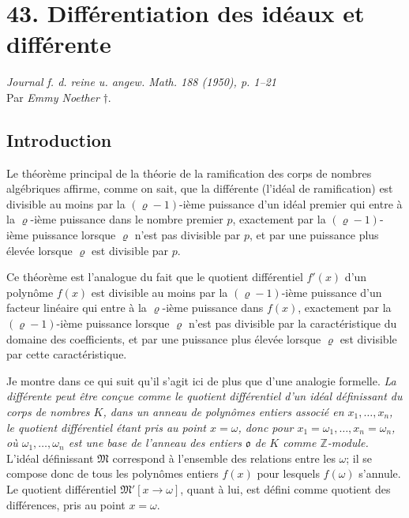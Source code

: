 \section*{43. Différentiation des idéaux et différente}

\begin{center}
\emph{Journal f. d. reine u. angew. Math. 188 (1950), p. 1--21}\\[0.75ex]
Par \emph{Emmy Noether} \(\dagger\).
\end{center}


\subsection*{Introduction}

Le théorème principal de la théorie de la ramification des corps de nombres algébriques affirme, comme on sait, que la différente (l'idéal de ramification) est divisible au moins par la \((\varrho-1)\)-ième puissance d'un idéal premier qui entre à la \(\varrho\)-ième puissance dans le nombre premier \(p\), exactement par la \((\varrho-1)\)-ième puissance lorsque \(\varrho\) n'est pas divisible par \(p\), et par une puissance plus élevée lorsque \(\varrho\) est divisible par \(p\).

Ce théorème est l'analogue du fait que le quotient différentiel \(f'(x)\) d'un polynôme \(f(x)\) est divisible au moins par la \((\varrho-1)\)-ième puissance d'un facteur linéaire qui entre à la \(\varrho\)-ième puissance dans \(f(x)\), exactement par la \((\varrho-1)\)-ième puissance lorsque \(\varrho\) n'est pas divisible par la caractéristique du domaine des coefficients, et par une puissance plus élevée lorsque \(\varrho\) est divisible par cette caractéristique.

Je montre dans ce qui suit qu'il s'agit ici de plus que d'une analogie formelle. \emph{La différente peut être conçue comme le quotient différentiel d'un idéal définissant du corps de nombres \(K\), dans un anneau de polynômes entiers associé en \(x_1,\ldots,x_n\), le quotient différentiel étant pris au point \(x=\omega\), donc pour \(x_1=\omega_1,\ldots,x_n=\omega_n\), où \(\omega_1,\ldots,\omega_n\) est une base de l'anneau des entiers \(\mathfrak o\) de \(K\) comme \(\mathbb Z\)-module.} L'idéal définissant \(\mathfrak M\) correspond à l'ensemble des relations entre les \(\omega\); il se compose donc de tous les polynômes entiers \(f(x)\) pour lesquels \(f(\omega)\) s'annule. Le quotient différentiel \(\mathfrak M'[x\to\omega]\), quant à lui, est défini comme quotient des différences, pris au point \(x=\omega\).

